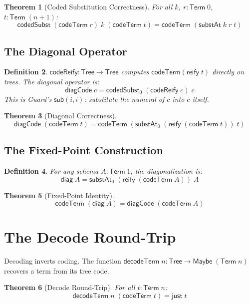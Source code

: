\documentclass[11pt]{article}
\newtheorem{theorem}{Theorem}
\newtheorem{definition}[theorem]{Definition}
\newcommand{\reify}{\mathsf{reify}}
\newcommand{\codeTerm}{\mathsf{codeTerm}}
\newcommand{\decodeTerm}{\mathsf{decodeTerm}}
\newcommand{\codeReify}{\mathsf{codeReify}}
\newcommand{\diagCode}{\mathsf{diagCode}}
\newcommand{\diag}{\mathsf{diag}}
\newcommand{\codedSubst}{\mathsf{codedSubst}}
\newcommand{\substAt}{\mathsf{substAt}}
\newcommand{\Tree}{\mathsf{Tree}}
\newcommand{\Term}{\mathsf{Term}}
\begin{document}
\begin{theorem}[Coded Substitution Correctness]
For all $k$, $r : \Term\;0$, $t : \Term\;(n{+}1)$:
\[
  \codedSubst\;(\codeTerm\;r)\;k\;(\codeTerm\;t) = \codeTerm\;(\substAt\;k\;r\;t)
\]
\end{theorem}

\subsection{The Diagonal Operator}

\begin{definition}
$\codeReify : \Tree \to \Tree$ computes $\codeTerm(\reify\;t)$ directly on trees.
The diagonal operator is:
\[
  \diagCode\;c = \codedSubst_0\;(\codeReify\;c)\;c
\]
This is Guard's $\mathsf{sub}(i, i)$: substitute the numeral of $c$ into $c$ itself.
\end{definition}

\begin{theorem}[Diagonal Correctness]
\[
  \diagCode\;(\codeTerm\;t) = \codeTerm\;(\substAt_0\;(\reify\;(\codeTerm\;t))\;t)
\]
\end{theorem}

\subsection{The Fixed-Point Construction}

\begin{definition}
For any schema $A : \Term\;1$, the diagonalization is:
\[
  \diag\;A = \substAt_0\;(\reify\;(\codeTerm\;A))\;A
\]
\end{definition}

\begin{theorem}[Fixed-Point Identity]
\[
  \codeTerm\;(\diag\;A) = \diagCode\;(\codeTerm\;A)
\]
\end{theorem}

\section{The Decode Round-Trip}

Decoding inverts coding. The function $\decodeTerm\;n : \Tree \to
\mathsf{Maybe}\;(\Term\;n)$ recovers a term from its tree code.

\begin{theorem}[Decode Round-Trip]\label{thm:round-trip}
For all $t : \Term\;n$:
\[
  \decodeTerm\;n\;(\codeTerm\;t) = \mathsf{just}\;t
\]
\end{theorem}
\end{document}
